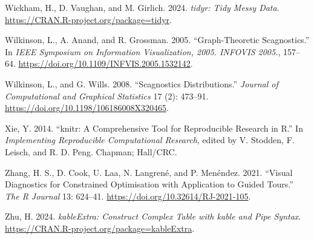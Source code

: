 \documentclass[
  12pt,
]{interact}
\newlength{\cslhangindent}
\newenvironment{CSLReferences}[2] %
 {\begin{list}{}{%
  \setlength{\itemindent}{0pt}
  \setlength{\leftmargin}{0pt}
  \setlength{\parsep}{0pt}
  \ifodd #1
   \setlength{\leftmargin}{\cslhangindent}
   \setlength{\itemindent}{-1\cslhangindent}
  \fi
  \setlength{\itemsep}{#2\baselineskip}}}
 {\end{list}}
\theoremstyle{plain}
\begin{document}
\begin{CSLReferences}{1}{0}
Wickham, H., D. Vaughan, and M. Girlich. 2024. \emph{{t}idyr: Tidy Messy
Data}. \url{https://CRAN.R-project.org/package=tidyr}.

Wilkinson, L., A. Anand, and R. Grossman. 2005. {``Graph-Theoretic
Scagnostics.''} In \emph{IEEE Symposium on Information Visualization,
2005. INFOVIS 2005.}, 157--64.
\url{https://doi.org/10.1109/INFVIS.2005.1532142}.

Wilkinson, L., and G. Wills. 2008. {``Scagnostics Distributions.''}
\emph{Journal of Computational and Graphical Statistics} 17 (2):
473--91. \url{https://doi.org/10.1198/106186008X320465}.

Xie, Y. 2014. {``{k}nitr: A Comprehensive Tool for Reproducible Research
in {R}.''} In \emph{Implementing Reproducible Computational Research},
edited by V. Stodden, F. Leisch, and R. D. Peng. Chapman; Hall/CRC.

Zhang, H. S., D. Cook, U. Laa, N. Langrené, and P. Menéndez. 2021.
{``Visual Diagnostics for Constrained Optimisation with Application to
Guided Tours.''} \emph{The R Journal} 13: 624--41.
\url{https://doi.org/10.32614/RJ-2021-105}.

Zhu, H. 2024. \emph{{k}ableExtra: Construct Complex Table with {kable}
and Pipe Syntax}. \url{https://CRAN.R-project.org/package=kableExtra}.

\end{CSLReferences}
\end{document}
